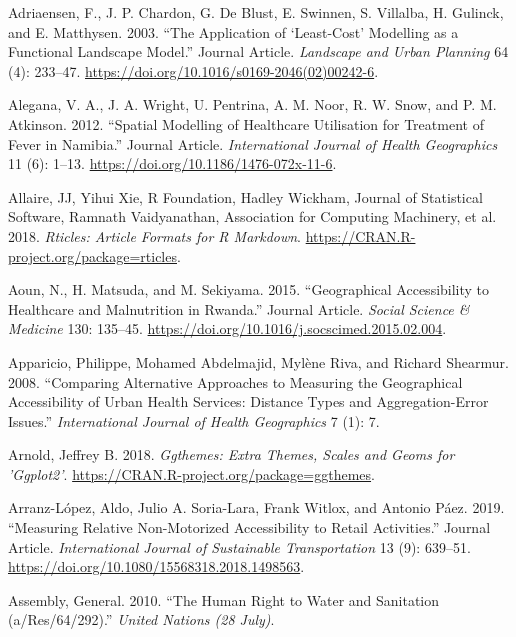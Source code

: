 \documentclass[]{elsarticle} %
\begin{document}
\hypertarget{refs}{}
\leavevmode\hypertarget{ref-Adriaensen2003}{}%
Adriaensen, F., J. P. Chardon, G. De Blust, E. Swinnen, S. Villalba, H.
Gulinck, and E. Matthysen. 2003. ``The Application of `Least-Cost'
Modelling as a Functional Landscape Model.'' Journal Article.
\emph{Landscape and Urban Planning} 64 (4): 233--47.
\url{https://doi.org/10.1016/s0169-2046(02)00242-6}.

\leavevmode\hypertarget{ref-Alegana2012}{}%
Alegana, V. A., J. A. Wright, U. Pentrina, A. M. Noor, R. W. Snow, and
P. M. Atkinson. 2012. ``Spatial Modelling of Healthcare Utilisation for
Treatment of Fever in Namibia.'' Journal Article. \emph{International
Journal of Health Geographics} 11 (6): 1--13.
\url{https://doi.org/10.1186/1476-072x-11-6}.

\leavevmode\hypertarget{ref-Allaire2018rticles}{}%
Allaire, JJ, Yihui Xie, R Foundation, Hadley Wickham, Journal of
Statistical Software, Ramnath Vaidyanathan, Association for Computing
Machinery, et al. 2018. \emph{Rticles: Article Formats for R Markdown}.
\url{https://CRAN.R-project.org/package=rticles}.

\leavevmode\hypertarget{ref-Aoun2015}{}%
Aoun, N., H. Matsuda, and M. Sekiyama. 2015. ``Geographical
Accessibility to Healthcare and Malnutrition in Rwanda.'' Journal
Article. \emph{Social Science \& Medicine} 130: 135--45.
\url{https://doi.org/10.1016/j.socscimed.2015.02.004}.

\leavevmode\hypertarget{ref-Apparicio2008}{}%
Apparicio, Philippe, Mohamed Abdelmajid, Mylène Riva, and Richard
Shearmur. 2008. ``Comparing Alternative Approaches to Measuring the
Geographical Accessibility of Urban Health Services: Distance Types and
Aggregation-Error Issues.'' \emph{International Journal of Health
Geographics} 7 (1): 7.

\leavevmode\hypertarget{ref-Arnold2018}{}%
Arnold, Jeffrey B. 2018. \emph{Ggthemes: Extra Themes, Scales and Geoms
for 'Ggplot2'}. \url{https://CRAN.R-project.org/package=ggthemes}.

\leavevmode\hypertarget{ref-Arranz2019measuring}{}%
Arranz-López, Aldo, Julio A. Soria-Lara, Frank Witlox, and Antonio Páez.
2019. ``Measuring Relative Non-Motorized Accessibility to Retail
Activities.'' Journal Article. \emph{International Journal of
Sustainable Transportation} 13 (9): 639--51.
\url{https://doi.org/10.1080/15568318.2018.1498563}.

\leavevmode\hypertarget{ref-assembly2010human}{}%
Assembly, General. 2010. ``The Human Right to Water and Sanitation
(a/Res/64/292).'' \emph{United Nations (28 July)}.
\end{document}
